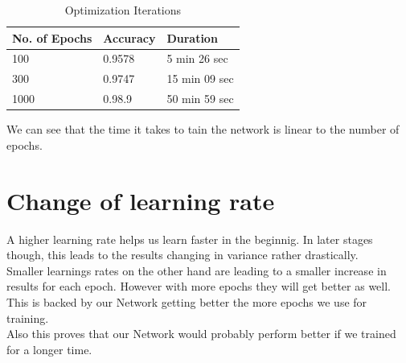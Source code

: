 \documentclass[twoside, twocolumn]{article}
\begin{document}
\begin{table}[htb]
\label{table_opt}
	\caption{Optimization Iterations}
	\centering
		\begin{tabular}{l l l}
			No. of Epochs & Accuracy & Duration \\
			\midrule
			100 & 0.9578 & 5 min 26 sec\\
			300 & 0.9747 & 15 min 09 sec\\
			1000 & 0.98.9 & 50 min 59 sec\\
\end{tabular}
\end{table}

We can see that the time it takes to tain the network is linear to the number of epochs.


\section{Change of learning rate}

A higher learning rate helps us learn faster in the beginnig. In later stages though, this leads to the results changing in variance rather drastically.\\
Smaller learnings rates on the other hand are leading to a smaller increase in results for each epoch. However with more epochs they will get better as well. This is backed by our Network getting better the more epochs we use for training.\\
Also this proves that our Network would probably perform better if we trained for a longer time.

\end{document}
